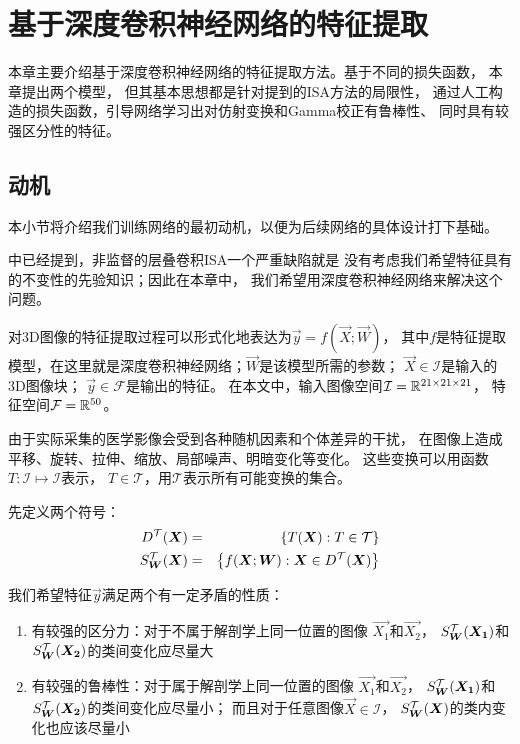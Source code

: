 
\chapter{基于深度卷积神经网络的特征提取}
本章主要介绍基于深度卷积神经网络的特征提取方法。基于不同的损失函数，
本章提出两个模型，
但其基本思想都是针对提到的ISA方法的局限性，
通过人工构造的损失函数，引导网络学习出对仿射变换和Gamma校正有鲁棒性、
同时具有较强区分性的特征。

\section{动机\label{sec:cnn:motivation}}
本小节将介绍我们训练网络的最初动机，以便为后续网络的具体设计打下基础。

中已经提到，非监督的层叠卷积ISA一个严重缺陷就是
没有考虑我们希望特征具有的不变性的先验知识；因此在本章中，
我们希望用深度卷积神经网络来解决这个问题。

对3D图像的特征提取过程可以形式化地表达为$\vec{y}=f(\vec{X};\vec{W})$，
其中$f$是特征提取模型，在这里就是深度卷积神经网络；$\vec{W}$是该模型所需的参数；
$\vec{X}\in\mathcal{I}$是输入的3D图像块； $\vec{y}\in\mathcal{F}$是输出的特征。
在本文中，输入图像空间$\mathcal{I}=\mathbb{R}^{21\times 21\times 21}$，
特征空间$\mathcal{F}=\mathbb{R}^{50}$。

由于实际采集的医学影像会受到各种随机因素和个体差异的干扰，
在图像上造成平移、旋转、拉伸、缩放、局部噪声、明暗变化等变化。
这些变换可以用函数$T:\mathcal{I}\mapsto\mathcal{I}$表示，
$T\in\mathcal{T}$，用$\mathcal{T}$表示所有可能变换的集合。

先定义两个符号：
\begin{eqnarray}
    D^{\mathcal{T}}(\boldsymbol{X}) &=& \left\{T(\boldsymbol{X}): T\in\mathcal{T}\right\} \nonumber \\
    S_{\boldsymbol{W}}^{\mathcal{T}}(\boldsymbol{X}) &=& \left\{f(\boldsymbol{X};\boldsymbol{W}):
    \boldsymbol{X}\in D^{\mathcal{T}}(\boldsymbol{X})\right\} \label{eqn:cnn:augdef}
\end{eqnarray}

我们希望特征$\vec{y}$满足两个有一定矛盾的性质：
\begin{enumerate}
    \item 有较强的区分力：对于不属于解剖学上同一位置的图像
        $\vec{X_1}$和$\vec{X_2}$，
        $S_{\boldsymbol{W}}^{\mathcal{T}}(\boldsymbol{X_1})$和$S_{\boldsymbol{W}}^{\mathcal{T}}(\boldsymbol{X_2})$的类间变化应尽量大
    \item 有较强的鲁棒性：对于属于解剖学上同一位置的图像
        $\vec{X_1}$和$\vec{X_2}$，
        $S_{\boldsymbol{W}}^{\mathcal{T}}(\boldsymbol{X_1})$和$S_{\boldsymbol{W}}^{\mathcal{T}}(\boldsymbol{X_2})$的类间变化应尽量小；
        而且对于任意图像$\vec{X}\in\mathcal{I}$，
        $S_{\boldsymbol{W}}^{\mathcal{T}}(\boldsymbol{X})$的类内变化也应该尽量小
\end{enumerate}

